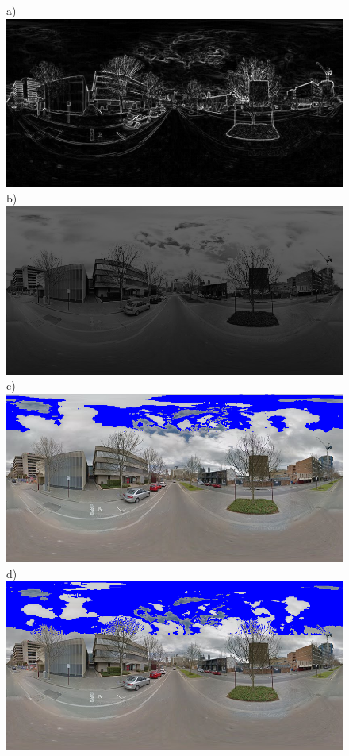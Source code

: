 \documentclass[final,3p,times,authoryear]{elsarticle}
\begin{document}
\begin{figure}
\centering    
a)\includegraphics[scale=0.20]{Images/panorama-ESuX4xmQ_fDc50NK6CnfZQ-1_Sobel.png} 
b)\includegraphics[scale=0.20]{Images/panorama-ESuX4xmQ_fDc50NK6CnfZQ-1_Sobel_prob.png} 
c)\includegraphics[scale=0.20]{Images/panorama-ESuX4xmQ_fDc50NK6CnfZQ-1_Sobel_95_marked.png} 
d)\includegraphics[scale=0.20]{Images/panorama-ESuX4xmQ_fDc50NK6CnfZQ-1_Sobel_90_marked.png} 

\end{figure}
\end{document}
